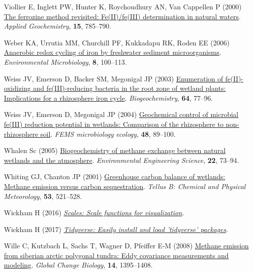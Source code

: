 \documentclass[
  12pt,
]{article}
\newlength{\cslhangindent}
\newenvironment{CSLReferences}[2] %
 {\begin{list}{}{%
  \setlength{\itemindent}{0pt}
  \setlength{\leftmargin}{0pt}
  \setlength{\parsep}{0pt}
  \ifodd #1
   \setlength{\leftmargin}{\cslhangindent}
   \setlength{\itemindent}{-1\cslhangindent}
  \fi
  \setlength{\itemsep}{#2\baselineskip}}}
 {\end{list}}
\begin{document}
\begin{CSLReferences}{1}{0}
Viollier E, Inglett PW, Hunter K, Roychoudhury AN, Van Cappellen P
(2000) \href{https://doi.org/10.1016/S0883-2927(99)00097-9}{The
ferrozine method revisited: Fe({II})/fe({III}) determination in natural
waters}. \emph{Applied Geochemistry}, \textbf{15}, 785--790.

Weber KA, Urrutia MM, Churchill PF, Kukkadapu RK, Roden EE (2006)
\href{https://doi.org/10.1111/j.1462-2920.2005.00873.x}{Anaerobic redox
cycling of iron by freshwater sediment microorganisms}.
\emph{Environmental Microbiology}, \textbf{8}, 100--113.

Weiss JV, Emerson D, Backer SM, Megonigal JP (2003)
\href{https://doi.org/10.1023/A:1024953027726}{Enumeration of
fe({II})-oxidizing and fe({III})-reducing bacteria in the root zone of
wetland plants: Implications for a rhizosphere iron cycle}.
\emph{Biogeochemistry}, \textbf{64}, 77--96.

Weiss JV, Emerson D, Megonigal JP (2004)
\href{https://doi.org/10.1016/j.femsec.2003.12.014}{Geochemical control
of microbial fe({III}) reduction potential in wetlands: Comparison of
the rhizosphere to non-rhizosphere soil}. \emph{{FEMS} microbiology
ecology}, \textbf{48}, 89--100.

Whalen Sc (2005)
\href{https://doi.org/10.1089/ees.2005.22.73}{Biogeochemistry of methane
exchange between natural wetlands and the atmosphere}.
\emph{Environmental Engineering Science}, \textbf{22}, 73--94.

Whiting GJ, Chanton JP (2001)
\href{https://doi.org/10.3402/tellusb.v53i5.16628}{Greenhouse carbon
balance of wetlands: Methane emission versus carbon sequestration}.
\emph{Tellus B: Chemical and Physical Meteorology}, \textbf{53},
521--528.

Wickham H (2016)
\emph{\emph{\href{https://CRAN.R-project.org/package=scales}{Scales:
Scale functions for visualization}}}.

Wickham H (2017)
\emph{\emph{\href{https://CRAN.R-project.org/package=tidyverse}{Tidyverse:
Easily install and load 'tidyverse' packages}}}.

Wille C, Kutzbach L, Sachs T, Wagner D, Pfeiffer E-M (2008)
\href{https://doi.org/10.1111/j.1365-2486.2008.01586.x}{Methane emission
from siberian arctic polygonal tundra: Eddy covariance measurements and
modeling}. \emph{Global Change Biology}, \textbf{14}, 1395--1408.


\end{CSLReferences}
\end{document}
